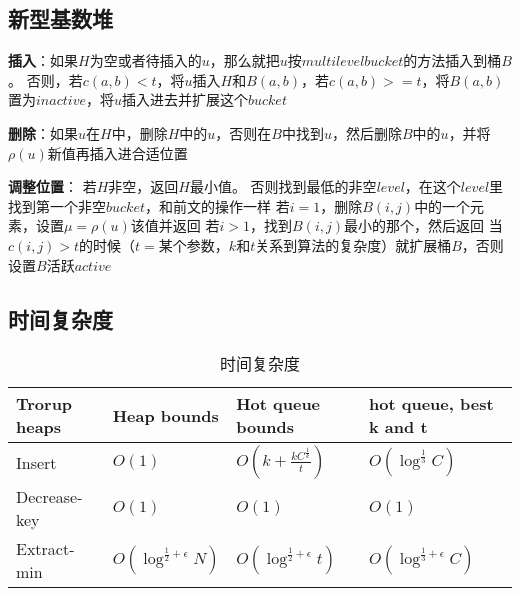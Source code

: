 \subsection{新型基数堆}

\textbf{插入}：如果$H$为空或者待插入的$u$，那么就把$u$按$multilevel bucket$的方法插入到桶$B$。
否则，若$c(a,b)<t$，将$u$插入$H$和$B(a,b)$，若$c(a,b)>=t$，将$B(a,b)$置为$inactive$，将$u$插入进去并扩展这个$bucket$
\par
\textbf{删除}：如果$u$在$H$中，删除$H$中的$u$，否则在$B$中找到$u$，然后删除$B$中的$u$，并将$\rho (u)$新值再插入进合适位置
\par
\textbf{调整位置}：
若$H$非空，返回$H$最小值。
否则找到最低的非空$level$，在这个$level$里找到第一个非空$bucket$，和前文的操作一样
若$i=1$，删除$B(i,j)$中的一个元素，设置$\mu =\rho (u)$该值并返回
若$i>1$，找到$B(i,j)$最小的那个，然后返回
当$c(i,j)>t$的时候（$t=$某个参数，$k$和$t$关系到算法的复杂度）就扩展桶$B$，否则设置$B$活跃$active$

\subsection{时间复杂度}

\begin{table}[H]
  \caption{时间复杂度}
  \label{tab22}
  \centering
  \begin{tabular}{p{2.5cm}<{\centering}p{3.6cm}<{\centering}p{3.6cm}<{\centering}p{3.8cm}<{\centering}}
  \toprule
   Trorup heaps & Heap bounds & Hot queue bounds & hot queue, best k and t\\
  \midrule
   Insert  & $O(1)$ & $O(k+\frac{kC^{\frac{1}{k}}}{t})$ & $O(\log ^{\frac{1}{3}}C)$  \\
   Decrease-key  & $O(1)$ & $O(1)$ & $O(1)$ \\
   Extract-min  & $O(\log ^{\frac{1}{2}+\epsilon}N)$ & $O(\log ^{\frac{1}{2}+\epsilon}t)$ & $O(\log ^{\frac{1}{3}+\epsilon}C)$\\
  \bottomrule
  \end{tabular} 
\end{table}